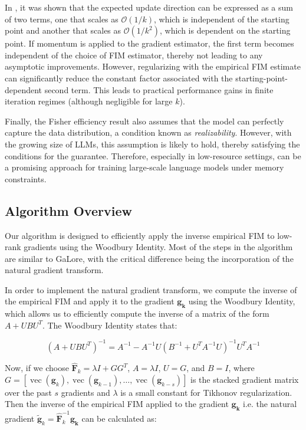 In \citep{martens2020new}, it was shown that the expected update direction can be expressed as a sum of two terms, one that scales as \(\mathcal{O}(1/k)\), which is independent of the starting point and another that scales as \(\mathcal{O}(1/k^2)\), which is dependent on the starting point. If momentum is applied to the gradient estimator, the first term becomes independent of the choice of FIM estimator, thereby not leading to any asymptotic improvements. However, regularizing with the empirical FIM estimate can significantly reduce the constant factor associated with the starting-point-dependent second term. This leads to practical performance gains in finite iteration regimes (although negligible for large \(k\)).

Finally, the Fisher efficiency result also assumes that the model can perfectly capture the data distribution, a condition known as \emph{realizability}. However, with the growing size of LLMs, this assumption is likely to hold, thereby satisfying the conditions for the guarantee. Therefore, especially in low-resource settings, \lowrank{} can be a promising approach for training large-scale language models under memory constraints.

\subsection{Algorithm Overview}

Our \lowrank{} algorithm is designed to efficiently apply the inverse empirical FIM to low-rank gradients using the Woodbury Identity. Most of the steps in the algorithm are similar to GaLore, with the critical difference being the incorporation of the natural gradient transform.

% 

In order to implement the natural gradient transform, we compute the inverse of the empirical FIM and apply it to the gradient \(\mathbf{g_{k}}\) using the Woodbury Identity, which allows us to efficiently compute the inverse of a matrix of the form \(A + UBU^T\). The Woodbury Identity states that:

\[
(A + UBU^T)^{-1} = A^{-1} - A^{-1}U(B^{-1} + U^TA^{-1}U)^{-1}U^TA^{-1}
\]

Now, if we choose \(\mathbf{\hat{F}}_{k} = \lambda I + GG^{T}\), \(A = \lambda I\), \(U = G\), and \(B = I\), where \(G = [\operatorname{vec}(\mathbf{g}_{k}), \operatorname{vec}(\mathbf{g}_{k-1}),\ldots, \operatorname{vec}(\mathbf{g}_{k-s})]\) is the stacked gradient matrix over the past \(s\) gradients and \(\lambda\) is a small constant for Tikhonov regularization. Then the inverse of the empirical FIM applied to the gradient \(\mathbf{g_{k}}\) i.e. the natural gradient \(\mathbf{\tilde{g}}_{k} = \mathbf{\hat{F}}_{k}^{-1}\mathbf{g_{k}}\) can be calculated as:

